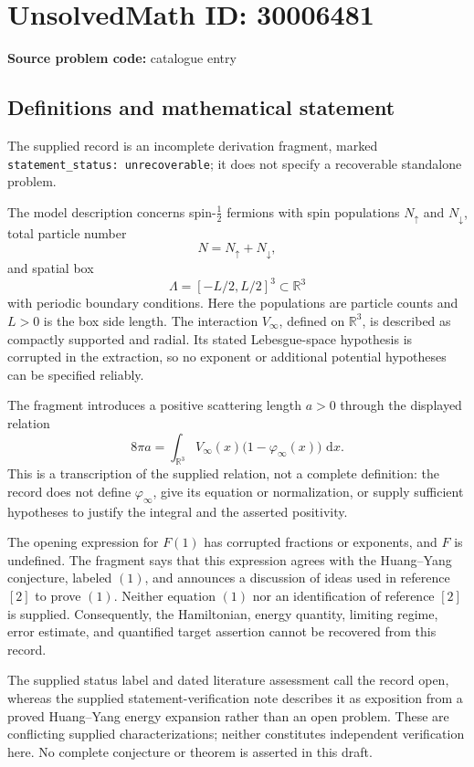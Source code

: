 \documentclass[11pt]{article}
\newcommand{\R}{\mathbb{R}}
\newcommand{\dd}{\,\mathrm{d}}
\begin{document}
\section*{UnsolvedMath ID: 30006481}
\textbf{Source problem code:} catalogue entry
\subsection{Definitions and mathematical statement}
The supplied record is an incomplete derivation fragment, marked \texttt{statement\_status: unrecoverable}; it does not specify a recoverable standalone problem.

The model description concerns spin-\(\tfrac12\) fermions with spin populations \(N_{\uparrow}\) and \(N_{\downarrow}\), total particle number
\[
N=N_{\uparrow}+N_{\downarrow},
\]
and spatial box
\[
\Lambda=[-L/2,L/2]^3\subset\R^3
\]
with periodic boundary conditions. Here the populations are particle counts and \(L>0\) is the box side length. The interaction \(V_{\infty}\), defined on \(\R^3\), is described as compactly supported and radial. Its stated Lebesgue-space hypothesis is corrupted in the extraction, so no exponent or additional potential hypotheses can be specified reliably.

The fragment introduces a positive scattering length \(a>0\) through the displayed relation
\[
8\pi a=\int_{\R^3}V_{\infty}(x)\bigl(1-\varphi_{\infty}(x)\bigr)\,\dd x.
\]
This is a transcription of the supplied relation, not a complete definition: the record does not define \(\varphi_{\infty}\), give its equation or normalization, or supply sufficient hypotheses to justify the integral and the asserted positivity.

The opening expression for \(F(1)\) has corrupted fractions or exponents, and \(F\) is undefined. The fragment says that this expression agrees with the Huang--Yang conjecture, labeled \((1)\), and announces a discussion of ideas used in reference \([2]\) to prove \((1)\). Neither equation \((1)\) nor an identification of reference \([2]\) is supplied. Consequently, the Hamiltonian, energy quantity, limiting regime, error estimate, and quantified target assertion cannot be recovered from this record.

The supplied status label and dated literature assessment call the record open, whereas the supplied statement-verification note describes it as exposition from a proved Huang--Yang energy expansion rather than an open problem. These are conflicting supplied characterizations; neither constitutes independent verification here. No complete conjecture or theorem is asserted in this draft.
\end{document}
